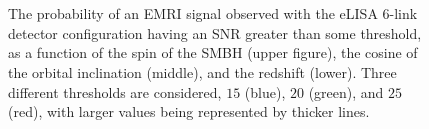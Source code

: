 \begin{figure}[htbp]
\centering
{}\\
\\
\caption{\label{fig:EMRI-detrate}The probability of an EMRI signal observed with the eLISA $6$-link detector configuration having an SNR greater than some threshold, as a function of the spin of the SMBH (upper figure), the cosine of the orbital inclination (middle), and the redshift (lower). Three different thresholds are considered, $15$ (blue), $20$ (green), and $25$ (red), with larger values being represented by thicker lines.}
\end{figure}

